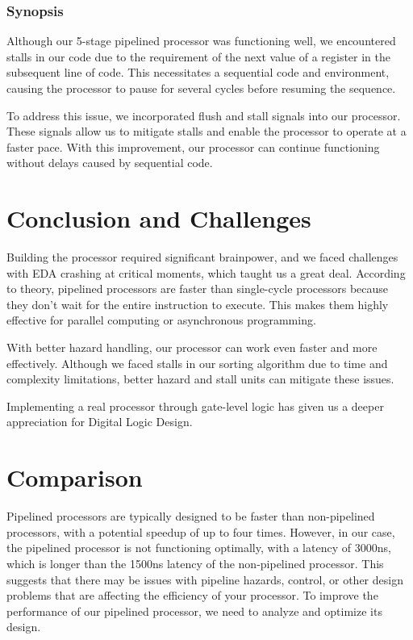 \documentclass{report}
\begin{document}
\subsection{Synopsis}

Although our 5-stage pipelined processor was functioning well, we encountered stalls in our code due to the requirement of the next value of a register in the subsequent line of code. This necessitates a sequential code and environment, causing the processor to pause for several cycles before resuming the sequence.

To address this issue, we incorporated flush and stall signals into our processor. These signals allow us to mitigate stalls and enable the processor to operate at a faster pace. With this improvement, our processor can continue functioning without delays caused by sequential code.

\chapter{Conclusion and Challenges}

Building the processor required significant brainpower, and we faced challenges with EDA crashing at critical moments, which taught us a great deal. According to theory, pipelined processors are faster than single-cycle processors because they don't wait for the entire instruction to execute. This makes them highly effective for parallel computing or asynchronous programming.

With better hazard handling, our processor can work even faster and more effectively. Although we faced stalls in our sorting algorithm due to time and complexity limitations, better hazard and stall units can mitigate these issues.

Implementing a real processor through gate-level logic has given us a deeper appreciation for Digital Logic Design.

\chapter{Comparison}

Pipelined processors are typically designed to be faster than non-pipelined processors, with a potential speedup of up to four times. However, in our case, the pipelined processor is not functioning optimally, with a latency of 3000ns, which is longer than the 1500ns latency of the non-pipelined processor. This suggests that there may be issues with pipeline hazards, control, or other design problems that are affecting the efficiency of your processor. To improve the performance of our pipelined processor, we need to analyze and optimize its design.
\end{document}
